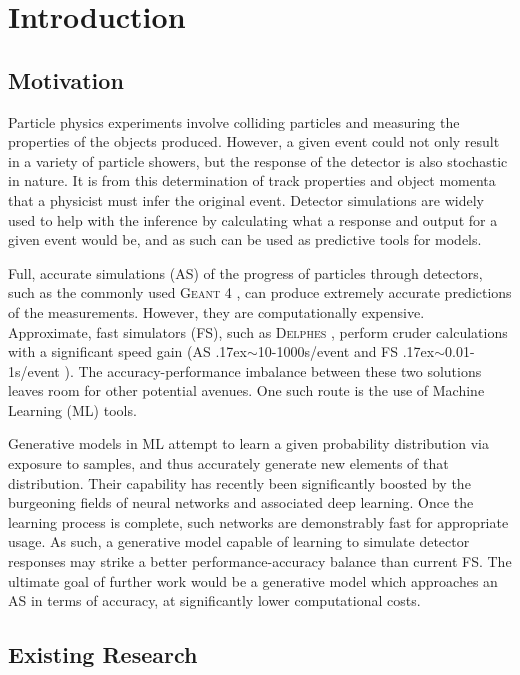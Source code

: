 \documentclass[twocolumn]{article}
\newcommand{\pkg}[1]{\textsc{#1}}
\newcommand{\around}{{\raise.17ex\hbox{$\scriptstyle\sim$}}}
\begin{document}
\clearpage
\section{Introduction}

\subsection{Motivation}
Particle physics experiments involve colliding particles and measuring the properties of the objects produced. However, a given event could not only result in a variety of particle showers, but the response of the detector is also stochastic in nature. It is from this determination of track properties and object momenta that a physicist must infer the original event. Detector simulations are widely used to help with the inference by calculating what a response and output for a given event would be, and as such can be used as predictive tools for models.

Full, accurate simulations (AS) of the progress of particles through detectors, such as the commonly used \pkg{Geant} 4 \cite{geant4}, can produce extremely accurate predictions of the measurements. However, they are computationally expensive. Approximate, fast simulators (FS), such as \pkg{Delphes} \cite{delphes}, perform cruder calculations with a significant speed gain (AS \around10-1000s/event and FS \around0.01-1s/event \cite{delphessl}). The accuracy-performance imbalance between these two solutions leaves room for other potential avenues. One such route is the use of Machine Learning (ML) tools.

Generative models in ML attempt to learn a given probability distribution via exposure to samples, and thus accurately generate new elements of that distribution. Their capability has recently been significantly boosted by the burgeoning fields of neural networks and associated deep learning. Once the learning process is complete, such networks are demonstrably fast for appropriate usage. As such, a generative model capable of learning to simulate detector responses may strike a better performance-accuracy balance than current FS. The ultimate goal of further work would be a generative model which approaches an AS in terms of accuracy, at significantly lower computational costs.

\subsection{Existing Research}
\end{document}
